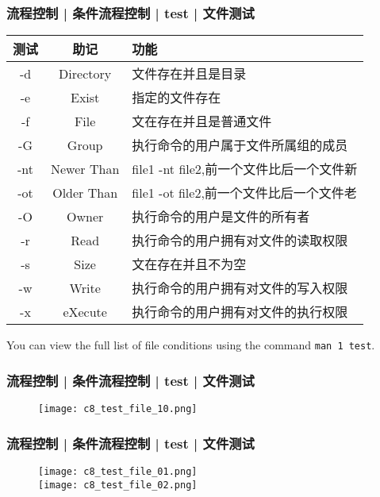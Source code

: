 \begin{frame}[fragile]
  \frametitle{流程控制 | 条件流程控制 | test | \alert{文件测试}}
  \begin{table}
    \centering
    \begin{tabularx}{\textwidth}{ccX}
      \hline
      \rowcolor{blue!50}测试 & 助记 & 功能\\
      \hline
      -d & Directory & 文件存在并且是目录\\
      -e & Exist & 指定的文件存在\\
      -f & File & 文在存在并且是普通文件\\
      -G & Group & 执行命令的用户属于文件所属组的成员\\
      -nt & Newer Than & file1 -nt file2,前一个文件比后一个文件新\\
      -ot & Older Than & file1 -ot file2,前一个文件比后一个文件老\\
      -O & Owner & 执行命令的用户是文件的所有者\\
      -r & Read & 执行命令的用户拥有对文件的读取权限\\
      -s & Size & 文在存在并且不为空\\
      -w & Write & 执行命令的用户拥有对文件的写入权限\\
      -x & eXecute & 执行命令的用户拥有对文件的执行权限\\
      \hline
    \end{tabularx}
  \end{table}
  You can view the full list of file conditions using the command \verb|man 1 test|.
\end{frame}

\begin{frame}
  \frametitle{流程控制 | 条件流程控制 | test | 文件测试}
  \begin{figure}
    \centering
    \texttt{[image: c8\_test\_file\_10.png]}
  \end{figure}
\end{frame}

\begin{frame}
  \frametitle{流程控制 | 条件流程控制 | test | 文件测试}
  \begin{figure}
    \centering
    \texttt{[image: c8\_test\_file\_01.png]}\\
    \texttt{[image: c8\_test\_file\_02.png]}
  \end{figure}
\end{frame}

